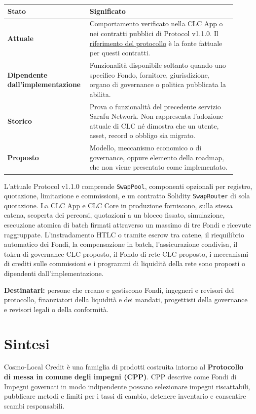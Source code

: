 \documentclass[11pt]{article}
\begin{document}
\begin{longtable}{P{0.30\linewidth} P{0.62\linewidth}}
\toprule
Stato & Significato \\
\midrule
\endhead
\textbf{Attuale} & Comportamento verificato nella CLC App o nei contratti pubblici di Protocol v1.1.0. Il \href{https://docs.cosmolocal.credit/it/protocol/overview}{riferimento del protocollo} è la fonte fattuale per questi contratti. \\
\textbf{Dipendente dall'implementazione} & Funzionalità disponibile soltanto quando uno specifico Fondo, fornitore, giurisdizione, organo di governance o politica pubblicata la abilita. \\
\textbf{Storico} & Prova o funzionalità del precedente servizio Sarafu Network. Non rappresenta l'adozione attuale di CLC né dimostra che un utente, asset, record o obbligo sia migrato. \\
\textbf{Proposto} & Modello, meccanismo economico o di governance, oppure elemento della roadmap, che non viene presentato come implementato. \\
\bottomrule
\end{longtable}

L'attuale Protocol v1.1.0 comprende \texttt{SwapPool}, componenti opzionali per registro, quotazione, limitazione e commissioni, e un contratto Solidity \texttt{SwapRouter} di sola quotazione. La CLC App e CLC Core in produzione forniscono, sulla stessa catena, scoperta dei percorsi, quotazioni a un blocco fissato, simulazione, esecuzione atomica di batch firmati attraverso un massimo di tre Fondi e ricevute raggruppate. L'instradamento HTLC o tramite escrow tra catene, il riequilibrio automatico dei Fondi, la compensazione in batch, l'assicurazione condivisa, il token di governance CLC proposto, il Fondo di rete CLC proposto, i meccanismi di crediti sulle commissioni e i programmi di liquidità della rete sono proposti o dipendenti dall'implementazione.

\textbf{Destinatari:} persone che creano e gestiscono Fondi, ingegneri e revisori del protocollo, finanziatori della liquidità e dei mandati, progettisti della governance e revisori legali o della conformità.

\section*{Sintesi}

Cosmo-Local Credit è una famiglia di prodotti costruita intorno al \textbf{Protocollo di messa in comune degli impegni (CPP)}. CPP descrive come Fondi di Impegni governati in modo indipendente possano selezionare impegni riscattabili, pubblicare metodi e limiti per i tassi di cambio, detenere inventario e consentire scambi responsabili.
\end{document}
